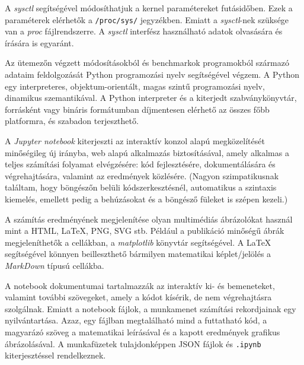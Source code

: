 
A \textit{sysctl} segítségével módosíthatjuk a kernel paramétereket futásidőben. Ezek a paraméterek elérhetők a \texttt{/proc/sys/} jegyzékben. Emiatt a \textit{sysctl}-nek szüksége van a \textit{proc} fájlrendszerre. A \textit{sysctl} interfész használható adatok olvasására és írására is egyaránt.


Az ütemezőn végzett módosításokból és benchmarkok programokból származó adataim feldolgozását Python programozási nyelv segítségével végzem.
A Python egy interpreteres, objektum-orientált, magas szintű programozási nyelv, dinamikus szemantikával.
A Python interpreter és a kiterjedt szabványkönyvtár, forrásként vagy bináris formátumban díjmentesen elérhető az összes főbb platformra, és szabadon terjeszthető.


A \textit{Jupyter notebook} kiterjeszti az interaktív konzol alapú megközelítését minőségileg új irányba, web alapú alkalmazás biztosításával, amely alkalmas a teljes számítási folyamat elvégzésére: kód fejlesztésére, dokumentálására és végrehajtására, valamint az eredmények közlésére.
(Nagyon szimpatikusnak találtam, hogy böngészőn belüli kódszerkesztésnél, automatikus a szintaxis kiemelés, emellett pedig a behúzásokat és a böngésző füleket is szépen kezeli.)

A számítás eredményének megjelenítése olyan multimédiás ábrázolókat használ mint a HTML, LaTeX, PNG, SVG stb. Például a publikáció minőségű ábrák megjeleníthetők a cellákban, a \textit{matplotlib} könyvtár segítségével. A LaTeX segítségével könnyen beilleszthető bármilyen matematikai képlet/jelölés a \textit{MarkDown} típusú cellákba.


A notebook dokumentumai tartalmazzák az interaktív ki- és bemeneteket, valamint további szövegeket, amely a kódot kísérik, de nem végrehajtásra szolgálnak. 
Emiatt a notebook fájlok, a munkamenet számítási rekordjainak egy nyilvántartása. Azaz, egy fájlban megtalálható mind a futtatható kód, a magyarázó szöveg a matematikai leírásával és a kapott eredmények grafikus ábrázolásával. A munkafüzetek tulajdonképpen JSON fájlok és \texttt{.ipynb} kiterjesztéssel rendelkeznek.

